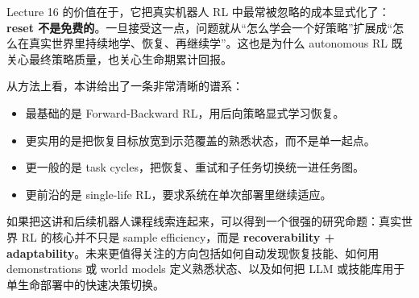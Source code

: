\documentclass[a4paper]{article}
\begin{document}
Lecture 16 的价值在于，它把真实机器人 RL 中最常被忽略的成本显式化了：\textbf{reset 不是免费的}。一旦接受这一点，问题就从“怎么学会一个好策略”扩展成“怎么在真实世界里持续地学、恢复、再继续学”。这也是为什么 autonomous RL 既关心最终策略质量，也关心生命期累计回报。

从方法上看，本讲给出了一条非常清晰的谱系：
\begin{itemize}
\item 最基础的是 Forward-Backward RL，用后向策略显式学习恢复。
\item 更实用的是把恢复目标放宽到示范覆盖的熟悉状态，而不是单一起点。
\item 更一般的是 task cycles，把恢复、重试和子任务切换统一进任务图。
\item 更前沿的是 single-life RL，要求系统在单次部署里继续适应。
\end{itemize}

如果把这讲和后续机器人课程线索连起来，可以得到一个很强的研究命题：真实世界 RL 的核心并不只是 sample efficiency，而是 \textbf{recoverability + adaptability}。未来更值得关注的方向包括如何自动发现恢复技能、如何用 demonstrations 或 world models 定义熟悉状态、以及如何把 LLM 或技能库用于单生命部署中的快速决策切换。
\end{document}
